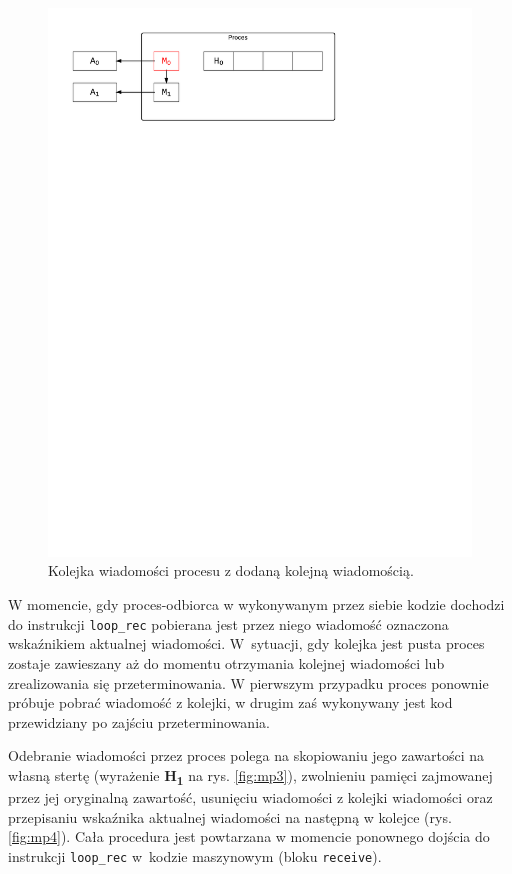 \begin{figure}[h]
\centerline{\includegraphics[scale=0.75, clip, trim=10mm 220mm 68mm 10mm]{mp2}}
\caption{Kolejka wiadomości procesu z dodaną kolejną wiadomością.}
\label{fig:mp2}
\end{figure}

W momencie, gdy proces-odbiorca w wykonywanym przez siebie kodzie dochodzi do instrukcji \texttt{loop\_rec} pobierana jest przez niego wiadomość oznaczona wskaźnikiem aktualnej wiadomości. W~sytuacji, gdy kolejka jest pusta proces zostaje zawieszany aż do momentu otrzymania kolejnej wiadomości lub zrealizowania się przeterminowania.
W pierwszym przypadku proces ponownie próbuje pobrać wiadomość z kolejki, w drugim zaś wykonywany jest kod przewidziany po zajściu przeterminowania.

Odebranie wiadomości przez proces polega na skopiowaniu jego zawartości na własną stertę (wyrażenie \textbf{H\textsubscript{1}} na rys. \ref{fig:mp3}), zwolnieniu pamięci zajmowanej przez jej oryginalną zawartość, usunięciu wiadomości z kolejki wiadomości oraz przepisaniu wskaźnika aktualnej wiadomości na następną w kolejce (rys. \ref{fig:mp4}).
Cała procedura jest powtarzana w momencie ponownego dojścia do instrukcji \texttt{loop\_rec} w~kodzie maszynowym (bloku \texttt{receive}).

